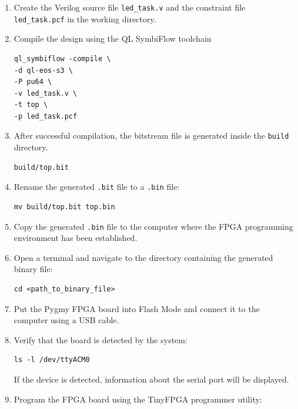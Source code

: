 \documentclass[12pt,a4paper]{article}
\begin{document}
\begin{enumerate}

\item Create the Verilog source file \texttt{led_task.v} and the constraint file \texttt{led_task.pcf} in the working directory.

\item Compile the design using the QL SymbiFlow toolchain

\begin{verbatim}
ql_symbiflow -compile \
-d ql-eos-s3 \
-P pu64 \
-v led_task.v \
-t top \
-p led_task.pcf
\end{verbatim}

\item After successful compilation, the bitstream file is generated inside the \texttt{build} directory.

\begin{verbatim}
build/top.bit
\end{verbatim}

\item Rename the generated \texttt{.bit} file to a \texttt{.bin} file:

\begin{verbatim}
mv build/top.bit top.bin
\end{verbatim}

\item Copy the generated \texttt{.bin} file to the computer where the FPGA programming environment has been established.

\item Open a terminal and navigate to the directory containing the generated binary file:

\begin{verbatim}
cd <path_to_binary_file>
\end{verbatim}

\item Put the Pygmy FPGA board into Flash Mode and connect it to the computer using a USB cable.

\item Verify that the board is detected by the system:

\begin{verbatim}
ls -l /dev/ttyACM0
\end{verbatim}

If the device is detected, information about the serial port will be displayed.

\item Program the FPGA board using the TinyFPGA programmer utility:


\end{enumerate}
\end{document}
